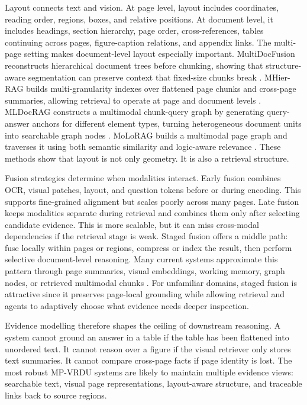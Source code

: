 \documentclass[10pt,a4paper]{article}
\begin{document}
Layout connects text and vision. At page level, layout includes coordinates, reading order, regions, boxes, and relative positions. At document level, it includes headings, section hierarchy, page order, cross-references, tables continuing across pages, figure-caption relations, and appendix links. The multi-page setting makes document-level layout especially important. MultiDocFusion reconstructs hierarchical document trees before chunking, showing that structure-aware segmentation can preserve context that fixed-size chunks break \cite{shin2025multidocfusion}. MHier-RAG builds multi-granularity indexes over flattened page chunks and cross-page summaries, allowing retrieval to operate at page and document levels \cite{gong2025mhier}. MLDocRAG constructs a multimodal chunk-query graph by generating query-answer anchors for different element types, turning heterogeneous document units into searchable graph nodes \cite{zhang2026mldocrag}. MoLoRAG builds a multimodal page graph and traverses it using both semantic similarity and logic-aware relevance \cite{wu2025molorag}. These methods show that layout is not only geometry. It is also a retrieval structure.

Fusion strategies determine when modalities interact. Early fusion combines OCR, visual patches, layout, and question tokens before or during encoding. This supports fine-grained alignment but scales poorly across many pages. Late fusion keeps modalities separate during retrieval and combines them only after selecting candidate evidence. This is more scalable, but it can miss cross-modal dependencies if the retrieval stage is weak. Staged fusion offers a middle path: fuse locally within pages or regions, compress or index the result, then perform selective document-level reasoning. Many current systems approximate this pattern through page summaries, visual embeddings, working memory, graph nodes, or retrieved multimodal chunks \cite{hannan2025docslm,cho2024m3docrag,gong2025mhier}. For unfamiliar domains, staged fusion is attractive since it preserves page-local grounding while allowing retrieval and agents to adaptively choose what evidence needs deeper inspection.

Evidence modelling therefore shapes the ceiling of downstream reasoning. A system cannot ground an answer in a table if the table has been flattened into unordered text. It cannot reason over a figure if the visual retriever only stores text summaries. It cannot compare cross-page facts if page identity is lost. The most robust MP-VRDU systems are likely to maintain multiple evidence views: searchable text, visual page representations, layout-aware structure, and traceable links back to source regions.
\end{document}
